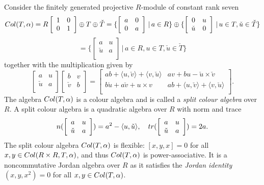 \documentclass[10pt]{amsart}
\theoremstyle{plain}
\theoremstyle{definition}
\begin{document}
 Consider the finitely generated projective $R$-module of constant rank seven
 $${\rm Col}(T,\alpha)= R\left [\begin {array}{cc}
 1 & 0\\
0  &  1 \\
\end {array}\right ]\oplus T\oplus\check{T}= \{ \left [\begin {array}{cc}
 a & 0\\
0  &  a \\
\end {array}\right ]\,|\, a\in R \} \oplus
\{ \left [\begin {array}{cc}
 0 & u\\
\check{u}  &  0 \\
\end {array}\right ] \,|\,  u\in T, \check{u}\in \check{T}
\}$$
 $$= \{ \left [\begin {array}{cc}
 a & u\\
\check{u}  &  a \\
\end {array}\right ] \,|\, a\in R, u\in T, \check{u}\in \check{T}
\}$$
together with the multiplication given by
$$
\left [\begin {array}{cc}
 a & u\\
\check{u}  &  a \\
\end {array}\right ]
\left [\begin {array}{cc}
 b & v\\
\check{v}  &  b \\
\end {array}\right ]
=
\left [\begin {array}{cc}
  ab+\langle u,\check{v}\rangle + \langle v,\check{u}\rangle & av+bu-\check{u}\times \check{v}\\
b\check{u} +a\check{v}+u\times v &  ab+\langle u,\check{v}\rangle + \langle v,\check{u}\rangle \\
\end {array}\right ].
$$
The algebra ${\rm Col}(T,\alpha)$ is a colour algebra and is called  a \emph{split colour algebra} over $R$.
A split colour algebra is a quadratic algebra over $R$ with norm and trace
\[
n(
\left [\begin {array}{cc}
 a & u\\
\check{u}  &  a \\
\end {array}\right ])=
a^2-\langle u,\check{u}\rangle, \quad
{\rm tr}(
\left [\begin {array}{cc}
 a & u\\
\check{u}  &  a \\
\end {array}\right ])=
2a.
\]
The split colour algebra ${\rm Col}(T,\alpha)$ is flexible: $[x,y,x]=0$ for all $x,y\in {\rm Col}(R\times R,T,\alpha)$, and thus ${\rm Col}(T,\alpha)$ is power-associative. It is  a noncommutative Jordan algebra over $R$ as it satisfies the \emph{Jordan identity} $(x,y,x^2)=0$ for all $x,y\in {\rm Col}(T,\alpha)$.
\end{document}
